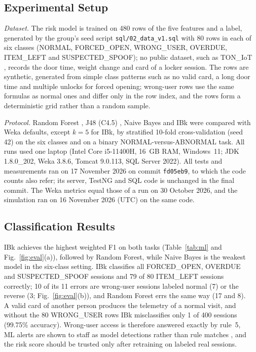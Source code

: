 \documentclass[manuscript,screen]{acmart}
\newcommand{\revisioncommit}{fd05eb9}
\begin{document}
\subsection{Experimental Setup}

\textit{Dataset.} The risk model is trained on 480 rows of the five features and a label, generated by the group's seed
script \texttt{sql/02\_data\_v1.sql} with 80 rows in each of six classes (NORMAL, FORCED\_OPEN, WRONG\_USER, OVERDUE,
ITEM\_LEFT and SUSPECTED\_SPOOF); no public dataset, such as TON\_IoT \cite{moustafa2021toniot}, records the door time,
weight change and card of a locker session. The rows are synthetic, generated from simple class patterns such as no
valid card, a long door time and multiple unlocks for forced opening; wrong-user rows use the same formulas as normal
ones and differ only in the row index, and the rows form a deterministic grid rather than a random sample.

\textit{Protocol.} Random Forest \cite{breiman2001rf}, J48 (C4.5) \cite{quinlan1993c45}, Naive Bayes \cite{john1995nb}
and IBk \cite{aha1991ibl} were compared with Weka defaults, except $k=5$ for IBk, by stratified 10-fold cross-validation
\cite{kohavi1995cv} (seed 42) on the six classes and on a binary NORMAL-versus-ABNORMAL task. All runs used one laptop
(Intel Core i5-11400H, 16~GB RAM, Windows~11; JDK 1.8.0\_202, Weka 3.8.6, Tomcat 9.0.113, SQL Server 2022). All tests and
measurements ran on 17 November 2026 on commit \texttt{\revisioncommit}, to which the code counts also refer; its server,
TestNG and SQL code is unchanged in the final commit. The Weka metrics equal those of a run on 30 October 2026, and the
simulation ran on 16 November 2026 (UTC) on the same code.

\subsection{Classification Results}

IBk achieves the highest weighted F1 on both tasks (Table~\ref{tab:ml} and Fig.~\ref{fig:eval}(a)),
followed by Random Forest, while Naive Bayes is the weakest model in the six-class setting. IBk classifies all
FORCED\_OPEN, OVERDUE and SUSPECTED\_SPOOF sessions and 79 of 80 ITEM\_LEFT sessions correctly; 10 of its 11 errors are
wrong-user sessions labeled normal (7) or the reverse (3; Fig.~\ref{fig:eval}(b)), and Random Forest errs the same way
(17 and 8). A valid card of another person produces the telemetry of a normal visit, and without the 80 WRONG\_USER rows IBk
misclassifies only 1 of 400 sessions (99.75\% accuracy). Wrong-user access is therefore answered exactly by rule~5,
ML alerts are shown to staff as model detections rather than rule matches \cite{sommer2010outside}, and the risk
score should be trusted only after retraining on labeled real sessions.
\end{document}
